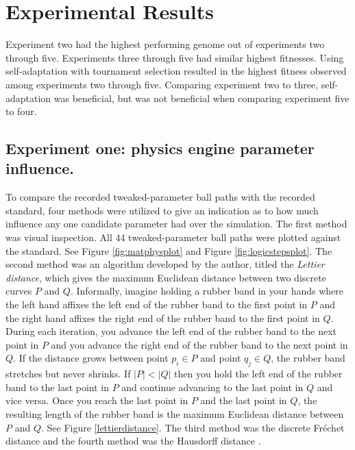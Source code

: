 \section{Experimental Results}

Experiment two had the highest performing genome out of experiments two through five. Experiments three through five had similar highest fitnesses. Using self-adaptation with tournament selection resulted in the highest fitness observed among experiments two through five. Comparing experiment two to three, self-adaptation was beneficial, but was not beneficial when comparing experiment five to four.   

\subsection[Experiment One]{Experiment one: physics engine parameter influence.}

To compare the recorded tweaked-parameter ball paths with the recorded standard, four methods were utilized to give an indication as to how much influence any one candidate parameter had over the simulation. The first method was visual inspection. All 44 tweaked-parameter ball paths were plotted against the standard. See Figure \ref{fig:matphysplot} and Figure \ref{fig:logicstepsplot}. The second method was an algorithm developed by the author, titled the \textit{Lettier distance}, which gives the maximum Euclidean distance between two discrete curves $P$ and $Q$. Informally, imagine holding a rubber band in your hands where the left hand affixes the left end of the rubber band to the first point in $P$ and the right hand affixes the right end of the rubber band to the first point in $Q$. During each iteration, you advance the left end of the rubber band to the next point in $P$ and you advance the right end of the rubber band to the next point in $Q$. If the distance grows between point $p_i\in P$ and point $q_j \in Q$, the rubber band stretches but never shrinks. If $|P|<|Q|$ then you hold the left end of the rubber band to the last point in $P$ and continue advancing to the last point in $Q$ and vice versa. Once you reach the last point in $P$ and the last point in $Q$, the resulting length of the rubber band is the maximum Euclidean distance between $P$ and $Q$. See Figure \ref{lettierdistance}. The third method was the discrete Fr{\'e}chet distance and the fourth method was the Hausdorff distance \cite{frechet} \cite{hausdorff}.


